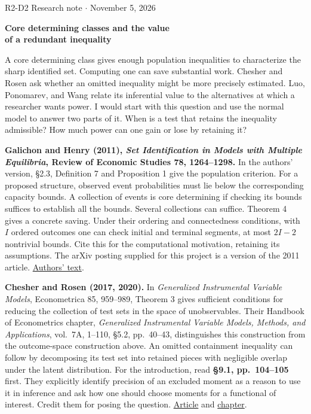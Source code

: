 \documentclass[12pt,letterpaper]{article}
\newcommand{\entry}[1]{\par\medskip{\large\bfseries #1}\par\nobreak}
\newcommand{\src}[2]{\href{#1}{#2}}
\begin{document}
{\small R2-D2 \hfill Research note $\cdot$ November 5, 2026}\par
{\LARGE\bfseries Core determining classes and the value\\[2pt] of a redundant inequality}\par
\medskip
A core determining class gives enough population inequalities to characterize the sharp identified set. Computing one can save substantial work. Chesher and Rosen ask whether an omitted inequality might be more precisely estimated. Luo, Ponomarev, and Wang relate its inferential value to the alternatives at which a researcher wants power. I would start with this question and use the normal model to answer two parts of it. When is a test that retains the inequality admissible? How much power can one gain or lose by retaining it?

\entry{Three references for the identification question}
\textbf{Galichon and Henry (2011), \emph{Set Identification in Models with Multiple Equilibria}, Review of Economic Studies 78, 1264--1298.}
In the authors' version, \S2.3, Definition 7 and Proposition 1 give the population criterion. For a proposed structure, observed event probabilities must lie below the corresponding capacity bounds. A collection of events is core determining if checking its bounds suffices to establish all the bounds. Several collections can suffice. Theorem 4 gives a concrete saving. Under their ordering and connectedness conditions, with $I$ ordered outcomes one can check initial and terminal segments, at most $2I-2$ nontrivial bounds. Cite this for the computational motivation, retaining its assumptions. The arXiv posting supplied for this project is a version of the 2011 article. \src{https://arxiv.org/html/2102.12249}{Authors' text}.

\textbf{Chesher and Rosen (2017, 2020).}
In \emph{Generalized Instrumental Variable Models}, Econometrica 85, 959--989, Theorem 3 gives sufficient conditions for reducing the collection of test sets in the space of unobservables. Their Handbook of Econometrics chapter, \emph{Generalized Instrumental Variable Models, Methods, and Applications}, vol.~7A, 1--110, \S5.2, pp.~40--43, distinguishes this construction from the outcome-space construction above. An omitted containment inequality can follow by decomposing its test set into retained pieces with negligible overlap under the latent distribution. For the introduction, read \textbf{\S9.1, pp.~104--105} first. They explicitly identify precision of an excluded moment as a reason to use it in inference and ask how one should choose moments for a functional of interest. Credit them for posing the question. \src{https://doi.org/10.3982/ECTA12223}{Article} and \src{https://doi.org/10.1016/bs.hoe.2019.11.001}{chapter}.
\end{document}
